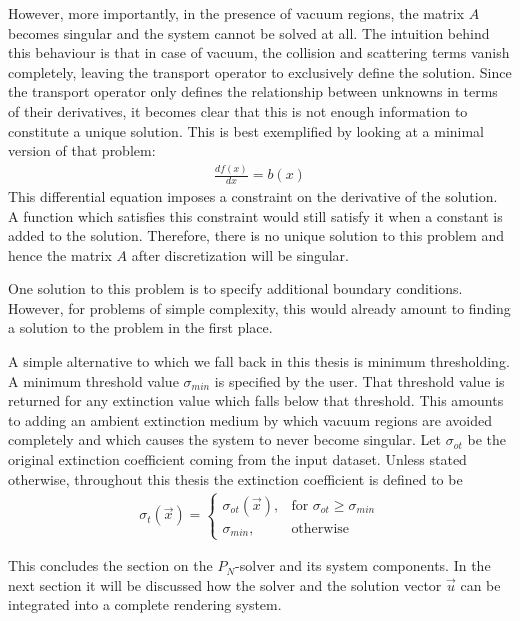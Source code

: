 However, more importantly, in the presence of vacuum regions, the matrix $A$ becomes singular and the system cannot be solved at all. The intuition behind this behaviour is that in case of vacuum, the collision and scattering terms vanish completely, leaving the transport operator to exclusively define the solution. Since the transport operator only defines the relationship between unknowns in terms of their derivatives, it becomes clear that this is not enough information to constitute a unique solution. This is best exemplified by looking at a minimal version of that problem:
\begin{align*}
\frac{df\left(x\right)}{dx} = b\left(x\right)
\end{align*}
This differential equation imposes a constraint on the derivative of the solution. A function which satisfies this constraint would still satisfy it when a constant is added to the solution. Therefore, there is no unique solution to this problem and hence the matrix $A$ after discretization will be singular.

One solution to this problem is to specify additional boundary conditions. However, for problems of simple complexity, this would already amount to finding a solution to the problem in the first place.

A simple alternative to which we fall back in this thesis is minimum thresholding. A minimum threshold value $\sigma_{min}$ is specified by the user. That threshold value is returned for any extinction value which falls below that threshold. This amounts to adding an ambient extinction medium by which vacuum regions are avoided completely and which causes the system to never become singular. Let $\sigma_{ot}$ be the original extinction coefficient coming from the input dataset. Unless stated otherwise, throughout this thesis the extinction coefficient is defined to be
\begin{align}
\label{eq:pn_solver_minimum_threshold}
\sigma_t\left(\vec{x}\right) =
\begin{cases}
\sigma_{ot}\left(\vec{x}\right), & \text{for $\sigma_{ot}\ge\sigma_{min}$}
\\
\sigma_{min}, & \text{otherwise}
\end{cases}
\end{align}

This concludes the section on the $P_N$-solver and its system components. In the next section it will be discussed how the solver and the solution vector $\vec{u}$ can be integrated into a complete rendering system.

